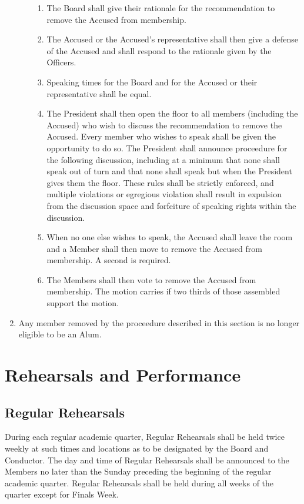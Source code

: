 \documentclass{article}
\begin{document}
\begin{enumerate}
\begin{enumerate}
\begin{enumerate}
\item The Board shall give their rationale for the recommendation to
remove the Accused from membership.
\item The Accused or the Accused's representative shall then give a defense
of the Accused and shall respond to the rationale given by the Officers.
\item Speaking times for the Board and for the Accused or their representative
shall be equal.
\item The President shall then open the floor to all members (including the
  Accused) who wish to discuss the recommendation to remove the Accused. Every
  member who wishes to speak shall be given the opportunity to do so. The
  President shall announce proceedure for the following discussion, including at
  a minimum that none shall speak out of turn and that none shall speak but when
  the President gives them the floor. These rules shall be strictly enforced,
  and multiple violations or egregious violation shall result in expulsion from
  the discussion space and forfeiture of speaking rights within the discussion.
\item When no one else wishes to speak, the Accused shall leave the room
and a Member shall then move to remove the Accused from membership.
A second is required.
\item The Members shall then vote to remove the Accused from membership.
The motion carries if two thirds of those assembled support the motion.
\end{enumerate}
\end{enumerate}
\item Any member removed by the proceedure described in this section is no
  longer eligible to be an Alum.
\end{enumerate}

\section{Rehearsals and Performance}

\subsection{Regular Rehearsals}

During each regular academic quarter, Regular Rehearsals shall be held twice
weekly at such times and locations as to be designated by the Board and
Conductor. The day and time of Regular Rehearsals shall be announced to the
Members no later than the Sunday preceding the beginning of the regular academic
quarter. Regular Rehearsals shall be held during all weeks of the quarter except
for Finals Week.
\end{document}
